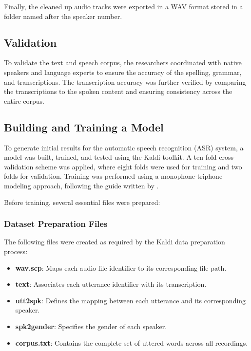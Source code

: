 Finally, the cleaned up audio tracks were exported in a WAV format stored in a folder named after the speaker number.

\subsection{Validation}

To validate the text and speech corpus, the researchers coordinated with native speakers and language experts to ensure the accuracy of the spelling, grammar, and transcriptions. The transcription accuracy was further verified by comparing the transcriptions to the spoken content and ensuring consistency across the entire corpus.

\subsection{Building and Training a Model}

To generate initial results for the automatic speech recognition (ASR) system, a model was built, trained, and tested using the Kaldi toolkit. A ten-fold cross-validation scheme was applied, where eight folds were used for training and two folds for validation. Training was performed using a monophone-triphone modeling approach, following the guide written by .

Before training, several essential files were prepared:

\subsubsection{Dataset Preparation Files}

The following files were created as required by the Kaldi data preparation process:

\begin{itemize}
    \item \textbf{wav.scp}: Maps each audio file identifier to its corresponding file path.
    \item \textbf{text}: Associates each utterance identifier with its transcription.
    \item \textbf{utt2spk}: Defines the mapping between each utterance and its corresponding speaker.
    \item \textbf{spk2gender}: Specifies the gender of each speaker.
    \item \textbf{corpus.txt}: Contains the complete set of uttered words across all recordings.
\end{itemize}

